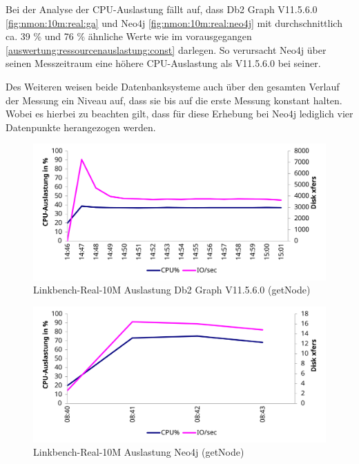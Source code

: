 Bei der Analyse der CPU-Auslastung fällt auf, dass Db2 Graph V11.5.6.0 \autoref{fig:nmon:10m:real:ga} und Neo4j \autoref{fig:nmon:10m:real:neo4j} mit durchschnittlich ca. 39 \% und 76 \% ähnliche Werte wie im vorausgegangen \autoref{auswertung:ressourcenauslastung:const} darlegen. So verursacht Neo4j über seinen Messzeitraum eine höhere CPU-Auslastung als V11.5.6.0 bei seiner.   

Des Weiteren weisen beide Datenbanksysteme auch über den gesamten Verlauf der Messung ein Niveau auf, dass sie bis auf die erste Messung konstant halten. Wobei es hierbei zu beachten gilt, dass für diese Erhebung bei Neo4j lediglich vier Datenpunkte herangezogen werden.

\begin{figure}[!ht]
    \centering
    \includegraphics[width=\textwidth]{images/stats/linkbench-10m-real_ga.pdf}
    \caption{Linkbench-Real-10M Auslastung Db2 Graph V11.5.6.0 (getNode)}
    \label{fig:nmon:10m:real:ga}
\end{figure}

\begin{figure}[!ht]
    \centering
    \includegraphics[width=\textwidth]{images/stats/linkbench-10m-real_neo4j.pdf}
    \caption{Linkbench-Real-10M Auslastung Neo4j (getNode)}
    \label{fig:nmon:10m:real:neo4j}
\end{figure}

